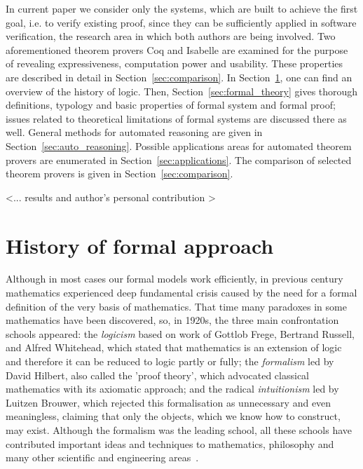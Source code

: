 \documentclass[article]{aaltoseries}
\begin{document}
In current paper we consider only the systems, which are built to achieve the first goal, i.e. to verify existing proof, since they can be sufficiently applied in software verification, the research area in which both authors are being involved. Two aforementioned theorem provers Coq and Isabelle are examined for the purpose of revealing expressiveness, computation power and usability. These properties are described in detail in Section~\ref{sec:comparison}. 
In Section~\ref{sec:formal_history}, one can find an overview of the history of logic. Then, Section~\ref{sec:formal_theory} gives thorough definitions, typology and basic properties of formal system and formal proof; issues related to theoretical limitations of formal systems are discussed there as well. General methods for automated reasoning are given in Section~\ref{sec:auto_reasoning}. Possible applications areas for automated theorem provers are enumerated in Section~\ref{sec:applications}. The comparison of selected theorem provers is given in Section~\ref{sec:comparison}.

<... results and author's personal contribution >



\section{History of formal approach}
\label{sec:formal_history}

Although in most cases our formal models work efficiently, in previous century mathematics experienced deep fundamental crisis caused by the need for a formal definition of the very basis of mathematics. That time many paradoxes in some mathematics have been discovered, so, in 1920s, the three main confrontation schools appeared:
the \textit{logicism} based on work of Gottlob Frege, Bertrand Russell, and Alfred Whitehead, which stated that mathematics is an extension of logic and therefore it can be reduced to logic partly or fully;
the \textit{formalism} led by David Hilbert, also called the 'proof theory', which advocated classical mathematics with its axiomatic approach;
and the radical \textit{intuitionism} led by Luitzen Brouwer, which rejected this formalisation as unnecessary and even meaningless, claiming that only the objects, which we know how to construct, may exist.
Although the formalism was the leading school, all these schools have contributed important ideas and techniques to mathematics, philosophy and many other scientific and engineering areas~\cite{Fer08}.
\end{document}
